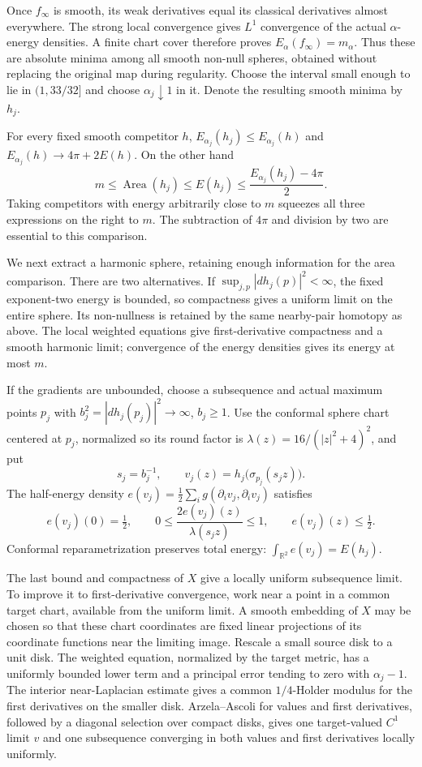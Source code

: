 Once $f_\infty$ is smooth, its weak derivatives equal its classical
derivatives almost everywhere. The strong local convergence gives
$L^1$ convergence of the actual $\alpha$-energy densities. A finite
chart cover therefore proves
$E_\alpha(f_\infty)=m_\alpha$. Thus these are absolute minima among
all smooth non-null spheres, obtained without replacing the original
map during regularity. Choose the interval small enough to lie in
$(1,33/32]$ and choose $\alpha_j\downarrow1$ in it. Denote the
resulting smooth minima by $h_j$.

For every fixed smooth competitor $h$,
$E_{\alpha_j}(h_j)\leq E_{\alpha_j}(h)$ and
$E_{\alpha_j}(h)\to4\pi+2E(h)$. On the other hand
\[
 m\leq\operatorname{Area}(h_j)\leq E(h_j)
       \leq\frac{E_{\alpha_j}(h_j)-4\pi}{2}.
\]
Taking competitors with energy arbitrarily close to $m$ squeezes all
three expressions on the right to $m$. The subtraction of $4\pi$ and
division by two are essential to this comparison.

We next extract a harmonic sphere, retaining enough information for
the area comparison. There are two alternatives. If
$\sup_{j,p}|dh_j(p)|^2<\infty$, the fixed exponent-two energy is
bounded, so compactness gives a uniform limit on the entire sphere.
Its non-nullness is retained by the same nearby-pair homotopy as
above. The local weighted equations give first-derivative compactness
and a smooth harmonic limit; convergence of the energy densities
gives its energy at most $m$.

If the gradients are unbounded, choose a subsequence and actual
maximum points $p_j$ with
$b_j^2=|dh_j(p_j)|^2\to\infty$, $b_j\geq1$. Use the conformal
sphere chart centered at $p_j$, normalized so its round factor is
$\lambda(z)=16/(|z|^2+4)^2$, and put
\[
 s_j=b_j^{-1},\qquad
 v_j(z)=h_j\bigl(\sigma_{p_j}(s_jz)\bigr).
\]
The half-energy density $e(v_j)=\tfrac12\sum_i
g(\partial_i v_j,\partial_i v_j)$ satisfies
\[
 e(v_j)(0)=\tfrac12,\qquad
 0\leq\frac{2e(v_j)(z)}{\lambda(s_jz)}\leq1,
 \qquad e(v_j)(z)\leq\tfrac12.
\]
Conformal reparametrization preserves total energy:
$\int_{\mathbb R^2}e(v_j)=E(h_j)$.

The last bound and compactness of $X$ give a locally uniform
subsequence limit. To improve it to first-derivative convergence,
work near a point in a common target chart, available from the
uniform limit. A smooth embedding of $X$ may be chosen so that these
chart coordinates are fixed linear projections of its coordinate
functions near the limiting image. Rescale a small source disk to a
unit disk. The weighted equation, normalized by the target metric,
has a uniformly bounded lower term and a principal error tending to
zero with $\alpha_j-1$. The interior near-Laplacian estimate gives
a common $1/4$-Holder modulus for the first derivatives on the
smaller disk. Arzela--Ascoli for values and first derivatives,
followed by a diagonal selection over compact disks, gives one
target-valued $C^1$ limit $v$ and one subsequence converging in both
values and first derivatives locally uniformly.

